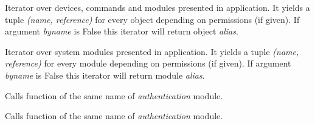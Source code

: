 \documentclass[letterpaper,10pt,english]{sphinxmanual}
\begin{document}
\begin{fulllineitems}
\begin{fulllineitems}
\end{fulllineitems}


\begin{fulllineitems}
\label{sysmod:pyfrid.modules.system.app.BaseApplicationModule.iterate_objects}
Iterator over devices, commands and modules presented in application.
It yields a tuple \emph{(name, reference)} for every object depending on permissions (if given).
If argument \emph{byname} is False this iterator will return object \emph{alias}.

\end{fulllineitems}


\begin{fulllineitems}
\label{sysmod:pyfrid.modules.system.app.BaseApplicationModule.iterate_sysmods}
Iterator over system modules presented in application. It yields a tuple \emph{(name, reference)} for every module
depending on permissions (if given). If argument \emph{byname} is False this iterator will return module \emph{alias}.

\end{fulllineitems}


\begin{fulllineitems}
\label{sysmod:pyfrid.modules.system.app.BaseApplicationModule.login}
Calls function of the same name of \emph{authentication} module.

\end{fulllineitems}


\begin{fulllineitems}
\label{sysmod:pyfrid.modules.system.app.BaseApplicationModule.logout}
Calls function of the same name of \emph{authentication} module.

\end{fulllineitems}


\end{fulllineitems}
\end{document}
